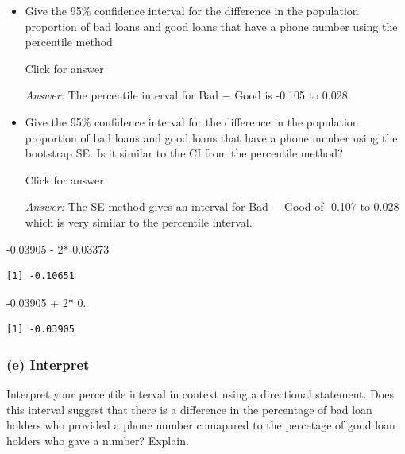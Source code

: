 \documentclass[
]{book}
\newenvironment{Shaded}{\begin{snugshade}}{\end{snugshade}}
\newcommand{\DecValTok}[1]{\textcolor[rgb]{0.00,0.00,0.81}{#1}}
\newcommand{\FloatTok}[1]{\textcolor[rgb]{0.00,0.00,0.81}{#1}}
\newcommand{\SpecialCharTok}[1]{\textcolor[rgb]{0.00,0.00,0.00}{#1}}
\providecommand{\tightlist}{%
  \setlength{\itemsep}{0pt}\setlength{\parskip}{0pt}}
\begin{document}
\begin{itemize}
\tightlist
\item
  Give the 95\% confidence interval for the difference in the population proportion of bad loans and good loans that have a phone number using the percentile method

  Click for answer

  \emph{Answer:} The percentile interval for Bad \(-\) Good is -0.105 to 0.028.
\item
  Give the 95\% confidence interval for the difference in the population proportion of bad loans and good loans that have a phone number using the bootstrap SE. Is it similar to the CI from the percentile method?

  Click for answer

  \emph{Answer:} The SE method gives an interval for Bad \(-\) Good of -0.107 to 0.028 which is very similar to the percentile interval.
\end{itemize}

\begin{Shaded}
\begin{Highlighting}[]
\SpecialCharTok{{-}}\FloatTok{0.03905} \SpecialCharTok{{-}} \DecValTok{2}\SpecialCharTok{*} \FloatTok{0.03373} 
\end{Highlighting}
\end{Shaded}

\begin{verbatim}
[1] -0.10651
\end{verbatim}

\begin{Shaded}
\begin{Highlighting}[]
\SpecialCharTok{{-}}\FloatTok{0.03905} \SpecialCharTok{+} \DecValTok{2}\SpecialCharTok{*} \FloatTok{0.}
\end{Highlighting}
\end{Shaded}

\begin{verbatim}
[1] -0.03905
\end{verbatim}

\hypertarget{e-interpret}{%
\subsubsection{(e) Interpret}\label{e-interpret}}

Interpret your percentile interval in context using a directional statement. Does this interval suggest that there is a difference in the percentage of bad loan holders who provided a phone number comapared to the percetage of good loan holders who gave a number? Explain.
\end{document}
